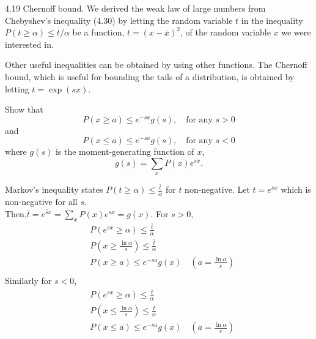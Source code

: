 \documentclass[12pt, a4paper]{article}
\begin{document}
\begin{prob}{4.19}
    Chernoff bound. We derived the weak law of large numbers from Chebyshev's inequality (4.30) by letting the random variable $t$ in the inequality $P(t \ge \alpha) \le \bar{t}/\alpha$ be a function, $t = (x - \bar{x})^2$, of the random variable $x$ we were interested in.

\vspace{0.5em}
\noindent Other useful inequalities can be obtained by using other functions. The Chernoff bound, which is useful for bounding the tails of a distribution, is obtained by letting $t = \exp(sx)$.

\vspace{0.5em}
\noindent Show that
\begin{equation}\tag{4.41}
P(x \ge a) \le e^{-sa}g(s), \quad \text{for any } s > 0
\end{equation}
and
\begin{equation}\tag{4.42}
P(x \le a) \le e^{-sa}g(s), \quad \text{for any } s < 0
\end{equation}
where $g(s)$ is the moment-generating function of $x$,
\begin{equation}\tag{4.43}
g(s) = \sum_x P(x) e^{sx}.
\end{equation}
\end{prob}
\begin{sol}
Markov's inequality states $P(t \geq \alpha) \leq \frac{\bar{t}}{\alpha}$ for $t$ non-negative. Let $t = e^{sx}$ which is non-negative for all $s$. \\
Then,$\bar{t} = \overline{e^{sx}} = \sum_x P(x)e^{sx} = g(x)$. For $s >0$,
\begin{align*}
    &P(e^{sx} \geq \alpha) \leq \frac{\bar{t}}{\alpha} \\
    &P(x \geq \frac{\ln \alpha}{s}) \leq \frac{\bar{t}}{\alpha} \\
    &P(x \geq a) \leq e^{-sa} g(x) \quad (a = \frac{\ln\alpha}{s}) \\
\end{align*}
Similarly for $s < 0$, 
\begin{align*}
    &P(e^{sx} \geq \alpha) \leq \frac{\bar{t}}{\alpha} \\
    &P(x \leq \frac{\ln \alpha}{s}) \leq \frac{\bar{t}}{\alpha} \\
    &P(x \leq a) \leq e^{-sa} g(x) \quad (a = \frac{\ln\alpha}{s}) \\
\end{align*}
\end{sol}
\bigskip
\end{document}
